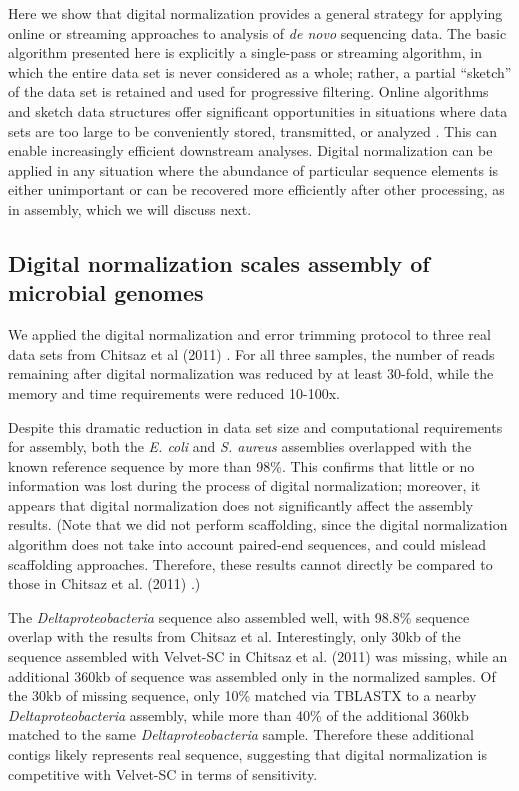 Here we show that digital normalization provides a general strategy for applying
online or streaming approaches to analysis of {\em de novo} sequencing
data.  The basic algorithm presented here is explicitly a single-pass or streaming
algorithm, in which the entire data set is never considered as a
whole; rather, a partial ``sketch'' of the data set is retained and
used for progressive filtering.  Online algorithms and sketch data
structures offer significant opportunities in situations where data
sets are too large to be conveniently stored, transmitted, or analyzed
\cite{muthukrishnan2005data}.  This can enable increasingly efficient
downstream analyses.
Digital normalization can be applied in any situation where the
abundance of particular sequence elements is either unimportant or can be
recovered more efficiently after other processing, as in assembly, which we will discuss
next.




\subsection{Digital normalization scales assembly of microbial genomes}

We applied the digital normalization and error trimming protocol to
three real data sets from Chitsaz et al (2011) \cite{pubmed21926975}. For all three samples, the number of reads
remaining after digital normalization was reduced by at least 30-fold, while
the memory and time requirements were reduced 10-100x.

%
Despite this dramatic reduction in data set size and computational requirements
for assembly, both the {\em E. coli} and {\em S. aureus} assemblies overlapped
with the known reference sequence by more than 98\%.  This confirms that little
or no information was lost during the process of digital normalization;
moreover, it appears that digital normalization does not significantly affect
the assembly results. (Note that we did not perform scaffolding, since the
digital normalization algorithm does not take into account paired-end
sequences, and could mislead scaffolding approaches.  Therefore, these results
cannot directly be compared to those in Chitsaz et al. (2011)
\cite{pubmed21926975}.)

The {\em Deltaproteobacteria} sequence also assembled well, with 98.8\%
sequence overlap with the results from Chitsaz et al. Interestingly, only 30kb
of the sequence assembled with Velvet-SC in Chitsaz et al. (2011) was missing,
while an additional 360kb of sequence was assembled only in the normalized
samples.  Of the 30kb of missing sequence, only 10\% matched via TBLASTX to a
nearby {\em Deltaproteobacteria} assembly, while more than 40\% of the
additional 360kb matched to the same {\em Deltaproteobacteria} sample.
Therefore these additional contigs likely represents real sequence, suggesting
that digital normalization is competitive with Velvet-SC in terms of
sensitivity.

